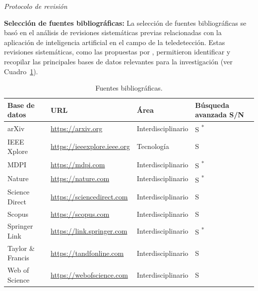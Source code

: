 \textit{Protocolo de revisión}

\textbf{Selección de fuentes bibliográficas:} La selección de fuentes bibliográficas se basó en el análisis de revisiones sistemáticas previas relacionadas con la aplicación de inteligencia artificial en el campo de la teledetección. Estas revisiones sistemáticas, como las propuestas por , permitieron identificar y recopilar las principales bases de datos relevantes para la investigación (ver Cuadro~\ref{tab:SeleccionFuentes}).

\begin{table}[H]
\small
\caption{Fuentes bibliográficas.}
\begin{tabularx}{\textwidth}{XlXp{2cm}}
\hline
\textbf{Base de datos} & \textbf{URL} & \textbf{Área} & \textbf{Búsqueda avanzada S/N}\\
\hline
arXiv &
\href{https://arxiv.org}{https://arxiv.org} & Interdisciplinario & S \textsuperscript{*}\\\hline
IEEE Xplore &
\href{https://ieeexplore.ieee.org}{https://ieeexplore.ieee.org} & Tecnología & S\\\hline
MDPI &
\href{https://mdpi.com}{https://mdpi.com} & Interdisciplinario & S \textsuperscript{*}\\\hline
Nature &
\href{https://nature.com}{https://nature.com} & Interdisciplinario & S \textsuperscript{*}\\\hline
Science Direct &
\href{https://sciencedirect.com}{https://sciencedirect.com} & Interdisciplinario & S\\\hline
Scopus &
\href{https://scopus.com}{https://scopus.com} & Interdisciplinario & S\\\hline
Springer Link &
\href{https://link.springer.com}{https://link.springer.com} & Interdisciplinario & S \textsuperscript{*}\\\hline
Taylor \& Francis &
\href{https://tandfonline.com}{https://tandfonline.com} & Interdisciplinario & S\\\hline
Web of Science &
\href{https://webofscience.com}{https://webofscience.com} & Interdisciplinario & S\\
\hline
\end{tabularx}
\vspace{0.25cm}
\newline
{}
\label{tab:SeleccionFuentes}
\end{table}

